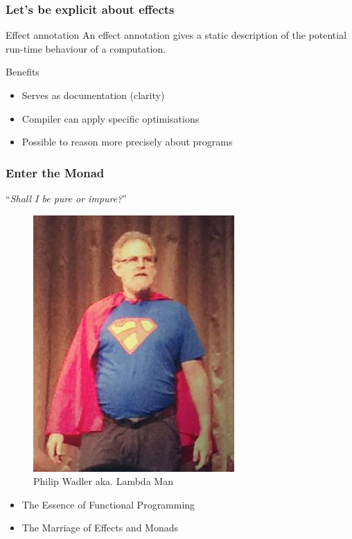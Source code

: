 \begin{frame}
  \frametitle{Let's be explicit about effects}
  \begin{block}{Effect annotation}
    An effect annotation gives a static description of the potential run-time behaviour of a computation.
  \end{block}
  Benefits
  \begin{itemize}
    \item Serves as documentation (clarity)
    \item Compiler can apply specific optimisations
    \item Possible to reason more precisely about programs
  \end{itemize}
\end{frame}

\begin{frame}
  \frametitle{Enter the Monad}
  \begin{center}
    ``\textit{Shall I be pure or impure?}''
    \begin{figure}
      \includegraphics[scale=0.3]{figures/lambdaman.png}
      \caption{Philip Wadler aka. Lambda Man}
    \end{figure}
  \end{center}
\begin{itemize}
  \item The Essence of Functional Programming \cite{Wadler1992}
  \item The Marriage of Effects and Monads \cite{Wadler2003}
\end{itemize}
\end{frame}


